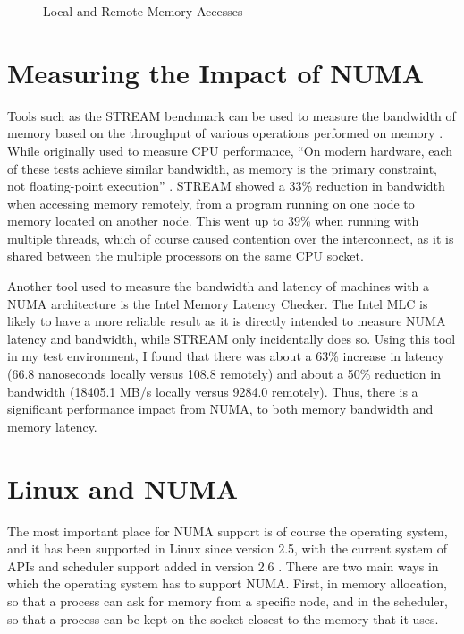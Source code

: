 \begin{figure}[H]
    \centering
    \resizebox{!}{0.25\textheight}{}
    \resizebox{!}{0.25\textheight}{}
    \captionsetup{width=0.8\linewidth}
    \caption{Local and Remote Memory Accesses}
    \label{fig:LocalvsRemote}
\end{figure}

\section{Measuring the Impact of NUMA}
\label{chapter:measuringnuma}
Tools such as the STREAM benchmark can be used to measure the bandwidth of memory based on the throughput of various operations
performed on memory \cite{bergstrom_stream}.
While originally used to measure CPU performance, ``On modern hardware, each of these tests achieve similar bandwidth,
as memory is the primary constraint, not floating-point execution'' \cite{bergstrom_stream}.
STREAM showed a 33\% reduction in bandwidth when accessing memory remotely, from a program running on one node to memory located
on another node. This went up to 39\% when running with multiple threads, which of course caused contention over the interconnect,
as it is shared between the multiple processors on the same CPU socket.

Another tool used to measure the bandwidth and latency of machines with a NUMA architecture is the Intel Memory Latency Checker.
The Intel MLC is likely to have a more reliable result as it is directly intended to measure NUMA latency and bandwidth,
while STREAM only incidentally does so.
Using this tool in my test environment, I found that there was about a 63\% increase in latency
(66.8 nanoseconds locally versus 108.8 remotely) and about a 50\% reduction in bandwidth 
(18405.1 MB/s locally versus 9284.0 remotely).
Thus, there is a significant performance impact from NUMA, to both memory bandwidth and memory latency.

\section{Linux and NUMA}
The most important place for NUMA support is of course the operating system, and it has been supported in Linux since version 2.5,
with the current system of APIs and scheduler support added in version 2.6 \cite{dobson_linux_numa}
\cite[{Documentation/admin-guide/mm/numa\_memory\_policy.rst}]{linux}.
There are two main ways in which the operating system has to support NUMA. First, in memory allocation, so that a process can ask for memory from
a specific node, and in the scheduler, so that a process can be kept on the socket closest to the memory that it uses.

